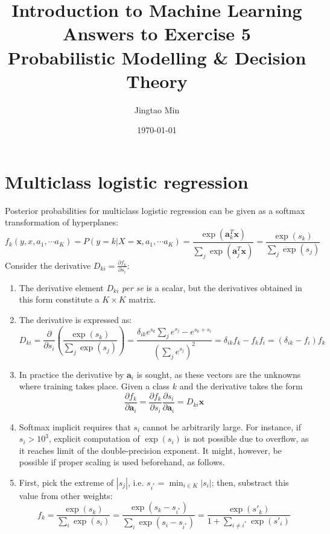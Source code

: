 \documentclass[a4paper, 10pt]{article}
\title{{\bfseries Introduction to Machine Learning} \\ Answers to Exercise 5 \\ Probabilistic Modelling \& Decision Theory}
\author{Jingtao Min}
\date{\today}
\begin{document}
\maketitle

\section{Multiclass logistic regression}

Posterior probabilities for multiclass logistic regression can be given as a softmax transformation of hyperplanes:
\begin{equation}
    f_k(y, x, a_1, \cdots a_K) = P(y=k | X=\mathbf{x}, a_1, \cdots a_K) = \frac{\exp\left(\mathbf{a}_k^T \mathbf{x}\right)}{\sum_j \exp\left(\mathbf{a}_j^T \mathbf{x}\right)} = \frac{\exp\left(s_k\right)}{\sum_j \exp\left(s_j\right)}
\end{equation}
Consider the derivative $D_{ki} = \frac{\partial f_k}{\partial s_i}$:

\begin{enumerate}[label=(\alph*)]
    \item The derivative element $D_{ki}$ \textit{per se} is a scalar, but the derivatives obtained in this form constitute a $K\times K$ matrix.
    \item The derivative is expressed as:
    \begin{equation}
        D_{ki} = \frac{\partial}{\partial s_i} \left(\frac{\exp\left(s_k\right)}{\sum_j \exp\left(s_j\right)}\right) = \frac{\delta_{ik} e^{s_k} \sum_j e^{s_j} - e^{s_k + s_i}}{\left(\sum_j e^{s_j}\right)^2} = \delta_{ik} f_k - f_k f_i = \left(\delta_{ik} - f_i\right) f_k
    \end{equation}

    \item In practice the derivative by $\mathbf{a}_i$ is sought, as these vectors are the unknowns where training takes place. Given a class $k$ and the derivative takes the form
    \begin{equation}
        \frac{\partial f_k}{\partial \mathbf{a}_i} = \frac{\partial f_k}{\partial s_i} \frac{\partial s_i}{\partial \mathbf{a}_i} = D_{ki} \mathbf{x}
    \end{equation}
    \item Softmax implicit requires that $s_i$ cannot be arbitrarily large. For instance, if $s_i > 10^3$, explicit computation of $\exp\left(s_i\right)$ is not possible due to overflow, as it reaches limit of the double-precision exponent. It might, however, be possible if proper scaling is used beforehand, as follows.
    \item First, pick the extreme of $|s_j|$, i.e. $s_{i^*} = \min_{i \in K} |s_i|$; then, substract this value from other weights:
    \begin{equation}
        f_k = \frac{\exp(s_k)}{\sum_i \exp(s_i)} = \frac{\exp(s_k - s_{i^*})}{\sum_i \exp(s_i - s_{i^*})} = \frac{\exp(s'_k)}{1 + \sum_{i\neq i^*} \exp(s'_i)}
    \end{equation}
\end{enumerate}
\end{document}
